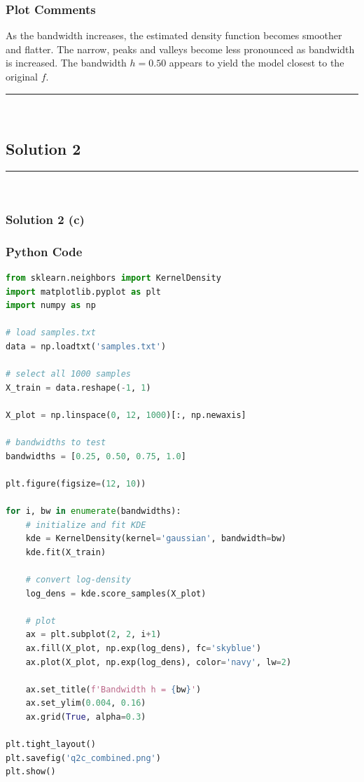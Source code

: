 \documentclass{article}
\begin{document}
\subsubsection*{Plot Comments}
\begin{flushleft}
    As the bandwidth increases, the estimated density function becomes smoother and flatter. The narrow, peaks and valleys become less pronounced as bandwidth is increased. The bandwidth $h=0.50$ appears to yield the model closest to the original $f$.
\end{flushleft}

\noindent\rule{\textwidth}{0.4pt}\\

\newpage

\subsection*{Solution 2}
\noindent\rule{\textwidth}{0.4pt}\\
\subsubsection*{Solution 2 (c)}
\subsubsection*{Python Code}

\begin{lstlisting}[language=Python]
from sklearn.neighbors import KernelDensity
import matplotlib.pyplot as plt
import numpy as np

# load samples.txt
data = np.loadtxt('samples.txt')

# select all 1000 samples
X_train = data.reshape(-1, 1)

X_plot = np.linspace(0, 12, 1000)[:, np.newaxis]

# bandwidths to test
bandwidths = [0.25, 0.50, 0.75, 1.0]

plt.figure(figsize=(12, 10))

for i, bw in enumerate(bandwidths):
    # initialize and fit KDE
    kde = KernelDensity(kernel='gaussian', bandwidth=bw)
    kde.fit(X_train)
    
    # convert log-density
    log_dens = kde.score_samples(X_plot)
    
    # plot
    ax = plt.subplot(2, 2, i+1)
    ax.fill(X_plot, np.exp(log_dens), fc='skyblue')
    ax.plot(X_plot, np.exp(log_dens), color='navy', lw=2)
    
    ax.set_title(f'Bandwidth h = {bw}')
    ax.set_ylim(0.004, 0.16)
    ax.grid(True, alpha=0.3)

plt.tight_layout()
plt.savefig('q2c_combined.png')
plt.show()
\end{lstlisting}
\end{document}

